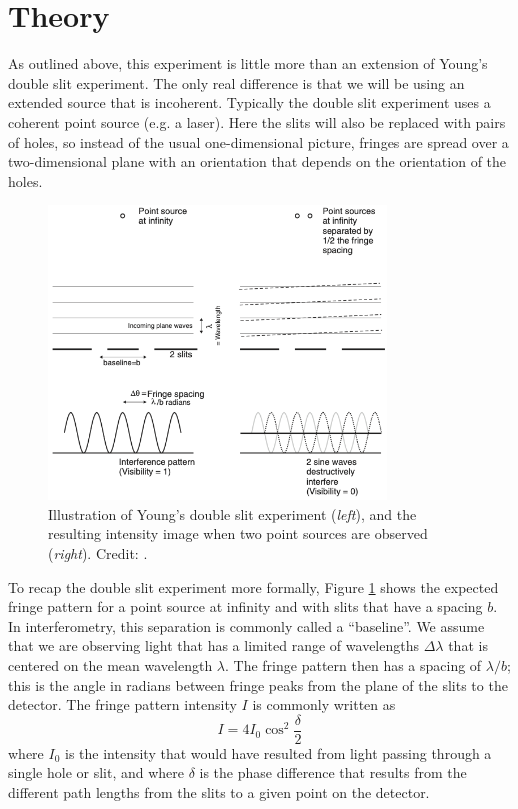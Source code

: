 \documentclass[11pt]{article}
\begin{document}
\clearpage
\section{Theory}\label{sec:theory}

As outlined above, this experiment is little more than an extension of Young's double slit experiment. The only real difference is that we will be using an extended source that is incoherent. Typically the double slit experiment uses a coherent point source (e.g. a laser). Here the slits will also be replaced with pairs of holes, so instead of the usual one-dimensional picture, fringes are spread over a two-dimensional plane with an orientation that depends on the orientation of the holes. 

\begin{figure}[h]
    \centering
    \includegraphics[width=0.8\textwidth]{doc/youngs.png}
    \caption{Illustration of Young's double slit experiment (\emph{left}), and the resulting intensity image when two point sources are observed (\emph{right}). Credit: \citet{2003RPPh...66..789M}.}
    \label{fig:youngs}
\end{figure}

To recap the double slit experiment more formally, Figure \ref{fig:youngs} shows the expected fringe pattern for a point source at infinity and with slits that have a spacing $b$. In interferometry, this separation is commonly called a ``baseline''. We assume that we are observing light that has a limited range of wavelengths $\Delta \lambda$ that is centered on the mean wavelength $\lambda$. The fringe pattern then has a spacing of $\lambda/b$; this is the angle in radians between fringe peaks from the plane of the slits to the detector. The fringe pattern intensity $I$ is commonly written as
\begin{equation}\label{eq:fringepattern}
    I = 4 I_0 \cos^2 \frac{\delta}{2}
\end{equation}
where $I_0$ is the intensity that would have resulted from light passing through a single hole or slit, and where $\delta$ is the phase difference that results from the different path lengths from the slits to a given point on the detector.
\end{document}
